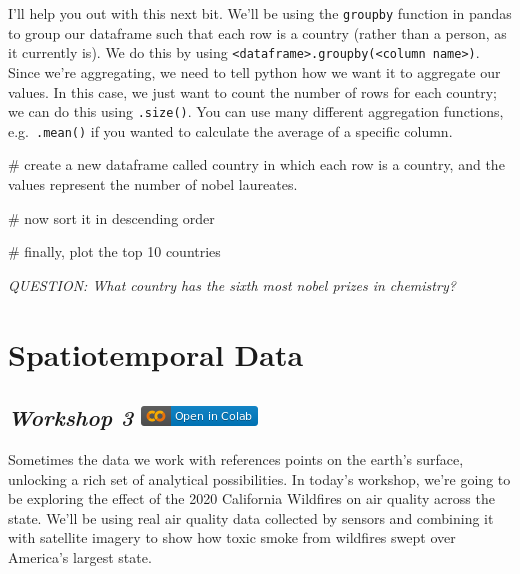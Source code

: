 \documentclass[
  letterpaper,
  DIV=11,
  numbers=noendperiod]{scrreprt}
\newenvironment{Shaded}{\begin{snugshade}}{\end{snugshade}}
\newcommand{\CommentTok}[1]{\textcolor[rgb]{0.37,0.37,0.37}{#1}}
\begin{document}
I'll help you out with this next bit. We'll be using the
\texttt{groupby} function in pandas to group our dataframe such that
each row is a country (rather than a person, as it currently is). We do
this by using
\texttt{\textless{}dataframe\textgreater{}.groupby(\textquotesingle{}\textless{}column\ name\textgreater{}\textquotesingle{})}.
Since we're aggregating, we need to tell python how we want it to
aggregate our values. In this case, we just want to count the number of
rows for each country; we can do this using \texttt{.size()}. You can
use many different aggregation functions, e.g.~\texttt{.mean()} if you
wanted to calculate the average of a specific column.

\begin{Shaded}
\begin{Highlighting}[]
\CommentTok{\# create a new dataframe called \textquotesingle{}country\textquotesingle{} in which each row is a country, and the values represent the number of nobel laureates. }

\CommentTok{\# now sort it in descending order}

\CommentTok{\# finally, plot the top 10 countries }
\end{Highlighting}
\end{Shaded}

\emph{QUESTION: What country has the sixth most nobel prizes in
chemistry?}


\hypertarget{spatiotemporal-data}{%
\chapter{Spatiotemporal Data}\label{spatiotemporal-data}}

\hypertarget{workshop-3-open-in-colab}{%
\section[\emph{Workshop 3} ]{\texorpdfstring{\emph{Workshop 3}
\href{https://colab.research.google.com/github/oballinger/QM2/blob/main/notebooks/W03.\%20Spatial\%20Data.ipynb}{\protect\includegraphics{index_files/mediabag/colab-badge.png}}}{Workshop 3 Open In Colab}}\label{workshop-3-open-in-colab}}

Sometimes the data we work with references points on the earth's
surface, unlocking a rich set of analytical possibilities. In today's
workshop, we're going to be exploring the effect of the 2020 California
Wildfires on air quality across the state. We'll be using real air
quality data collected by sensors and combining it with satellite
imagery to show how toxic smoke from wildfires swept over America's
largest state.
\end{document}
